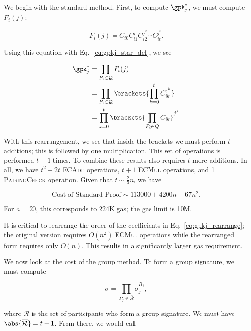 

We begin with the standard method.
First, to compute $\gpk_{j}^{*}$, we must compute $F_{i}(j)$:

\begin{equation}
    F_{i}(j) = C_{i0}C_{i1}^{j}C_{i2}^{j^{2}}\cdots C_{it}^{j^{t}}.
\end{equation}

\noindent
Using this equation with Eq.~\eqref{eq:gpkj_star_def},
we see

\begin{align}
    \gpk_{j}^{*} &= \prod_{P_{i}\in\mathcal{Q}}F_{i}(j)
            \nonumber\\
        &= \prod_{P_{i}\in\mathcal{Q}} \brackets{\prod_{k=0}^{t} C_{ik}^{j^{k}}}
            \nonumber\\
        &= \prod_{k=0}^{t}
            \brackets{\prod_{P_{i}\in\mathcal{Q}} C_{ik}}^{j^{k}}
    \label{eq:gpkj_rearrange}
\end{align}

\noindent
With this rearrangement, we see that inside the brackets we must perform
$t$ additions; this is followed by one multiplication.
This set of operations is performed $t+1$ times.
To combine these results also requires $t$ more additions.
In all, we have $t^{2} + 2t$ \textsc{ECAdd} operations,
$t+1$ \textsc{ECMul} operations,
and 1 \textsc{PairingCheck} operation.
Given that $t \sim \frac{2}{3}n$, we have

\begin{equation}
    \text{Cost of Standard Proof} \sim 113000 + 4200n + 67n^{2}.
\end{equation}

\noindent
For $n=20$, this corresponds to $224$K gas;
the gas limit is 10M.

It is critical to rearrange the order of the coefficients
in Eq.~\eqref{eq:gpkj_rearrange};
the original version requires $O(n^{2})$ \textsc{ECMul} operations
while the rearranged form requires only $O(n)$.
This results in a significantly larger gas requirement.

We now look at the cost of the group method.
To form a group signature, we must compute

\begin{equation}
    \sigma = \prod_{P_{j}\in\overline{\mathcal{R}}} \sigma_{j}^{R_{j}},
\end{equation}

\noindent
where $\overline{\mathcal{R}}$ is the set of participants
who form a group signature.
We must have $\abs{\overline{\mathcal{R}}} = t+1$.
From there, we would call

